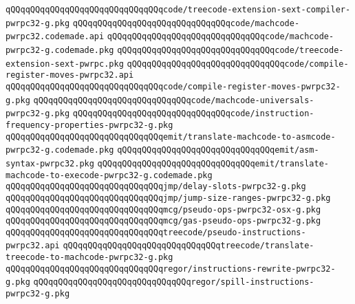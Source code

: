 \verb|qQQqqQQqqQQqqQQqqQQqqQQqqQQqqQQqcode/treecode-extension-sext-compiler-pwrpc32-g.pkg|\newline
\verb|qQQqqQQqqQQqqQQqqQQqqQQqqQQqqQQqcode/machcode-pwrpc32.codemade.api|\newline
\verb|qQQqqQQqqQQqqQQqqQQqqQQqqQQqqQQqcode/machcode-pwrpc32-g.codemade.pkg|\newline
\verb|qQQqqQQqqQQqqQQqqQQqqQQqqQQqqQQqcode/treecode-extension-sext-pwrpc.pkg|\newline
\verb|qQQqqQQqqQQqqQQqqQQqqQQqqQQqqQQqcode/compile-register-moves-pwrpc32.api|\newline
\verb|qQQqqQQqqQQqqQQqqQQqqQQqqQQqqQQqcode/compile-register-moves-pwrpc32-g.pkg|\newline
\verb|qQQqqQQqqQQqqQQqqQQqqQQqqQQqqQQqcode/machcode-universals-pwrpc32-g.pkg|\newline
\verb|qQQqqQQqqQQqqQQqqQQqqQQqqQQqqQQqcode/instruction-frequency-properties-pwrpc32-g.pkg|\newline
\verb|qQQqqQQqqQQqqQQqqQQqqQQqqQQqqQQqemit/translate-machcode-to-asmcode-pwrpc32-g.codemade.pkg|\newline
\verb|qQQqqQQqqQQqqQQqqQQqqQQqqQQqqQQqemit/asm-syntax-pwrpc32.pkg|\newline
\verb|qQQqqQQqqQQqqQQqqQQqqQQqqQQqqQQqemit/translate-machcode-to-execode-pwrpc32-g.codemade.pkg|\newline
\verb|qQQqqQQqqQQqqQQqqQQqqQQqqQQqqQQqjmp/delay-slots-pwrpc32-g.pkg|\newline
\verb|qQQqqQQqqQQqqQQqqQQqqQQqqQQqqQQqjmp/jump-size-ranges-pwrpc32-g.pkg|\newline
\verb|qQQqqQQqqQQqqQQqqQQqqQQqqQQqqQQqmcg/pseudo-ops-pwrpc32-osx-g.pkg|\newline
\verb|qQQqqQQqqQQqqQQqqQQqqQQqqQQqqQQqmcg/gas-pseudo-ops-pwrpc32-g.pkg|\newline
\verb|qQQqqQQqqQQqqQQqqQQqqQQqqQQqqQQqtreecode/pseudo-instructions-pwrpc32.api|\newline
\verb|qQQqqQQqqQQqqQQqqQQqqQQqqQQqqQQqtreecode/translate-treecode-to-machcode-pwrpc32-g.pkg|\newline
\verb|qQQqqQQqqQQqqQQqqQQqqQQqqQQqqQQqregor/instructions-rewrite-pwrpc32-g.pkg|\newline
\verb|qQQqqQQqqQQqqQQqqQQqqQQqqQQqqQQqregor/spill-instructions-pwrpc32-g.pkg|\newline
\newline

